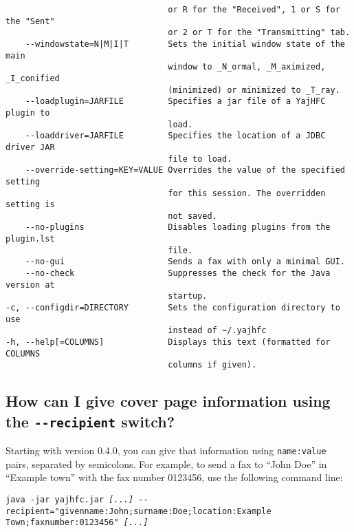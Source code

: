\documentclass[a4paper,10pt]{scrartcl}
\begin{document}
\begin{verbatim}
                                 or R for the "Received", 1 or S for the "Sent"
                                 or 2 or T for the "Transmitting" tab.
    --windowstate=N|M|I|T        Sets the initial window state of the main
                                 window to _N_ormal, _M_aximized, _I_conified
                                 (minimized) or minimized to _T_ray.
    --loadplugin=JARFILE         Specifies a jar file of a YajHFC plugin to
                                 load.
    --loaddriver=JARFILE         Specifies the location of a JDBC driver JAR
                                 file to load.
    --override-setting=KEY=VALUE Overrides the value of the specified setting
                                 for this session. The overridden setting is
                                 not saved.
    --no-plugins                 Disables loading plugins from the plugin.lst
                                 file.
    --no-gui                     Sends a fax with only a minimal GUI.
    --no-check                   Suppresses the check for the Java version at
                                 startup.
-c, --configdir=DIRECTORY        Sets the configuration directory to use
                                 instead of ~/.yajhfc
-h, --help[=COLUMNS]             Displays this text (formatted for COLUMNS
                                 columns if given).
\end{verbatim}

\subsection{How can I give cover page information using the \texttt{-{-}recipient} switch?}

Starting with version 0.4.0, you can give that information using \texttt{name:value} pairs, separated by semicolons. For example, to send a fax to ``John Doe'' in ``Example town'' with the fax number 0123456, use the following command line:

\texttt{java -jar yajhfc.jar \textit{[...]} -{-}recipient="givenname:John;surname:Doe;location:Example Town;faxnumber:0123456" \textit{[...]}}
\end{document}
